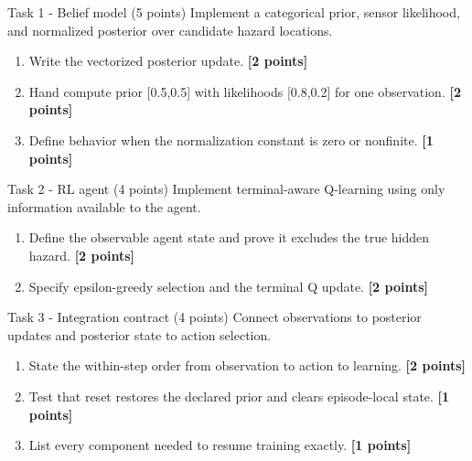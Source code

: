 \documentclass[aspectratio=169,11pt]{beamer}
\begin{document}
\begin{frame}{Task 1 - Belief model (5 points)}
\small
Implement a categorical prior, sensor likelihood, and normalized posterior over candidate hazard locations.

\vspace{0.2cm}
\begin{enumerate}
\item[\textbf{a.}] Write the vectorized posterior update. \hfill{\color{courseblue}\textbf{[2 points]}}
\item[\textbf{b.}] Hand compute prior [0.5,0.5] with likelihoods [0.8,0.2] for one observation. \hfill{\color{courseblue}\textbf{[2 points]}}
\item[\textbf{c.}] Define behavior when the normalization constant is zero or nonfinite. \hfill{\color{courseblue}\textbf{[1 points]}}
\end{enumerate}
\end{frame}

\begin{frame}{Task 2 - RL agent (4 points)}
\small
Implement terminal-aware Q-learning using only information available to the agent.

\vspace{0.2cm}
\begin{enumerate}
\item[\textbf{a.}] Define the observable agent state and prove it excludes the true hidden hazard. \hfill{\color{courseblue}\textbf{[2 points]}}
\item[\textbf{b.}] Specify epsilon-greedy selection and the terminal Q update. \hfill{\color{courseblue}\textbf{[2 points]}}
\end{enumerate}
\end{frame}

\begin{frame}{Task 3 - Integration contract (4 points)}
\small
Connect observations to posterior updates and posterior state to action selection.

\vspace{0.2cm}
\begin{enumerate}
\item[\textbf{a.}] State the within-step order from observation to action to learning. \hfill{\color{courseblue}\textbf{[2 points]}}
\item[\textbf{b.}] Test that reset restores the declared prior and clears episode-local state. \hfill{\color{courseblue}\textbf{[1 points]}}
\item[\textbf{c.}] List every component needed to resume training exactly. \hfill{\color{courseblue}\textbf{[1 points]}}
\end{enumerate}
\end{frame}
\end{document}
